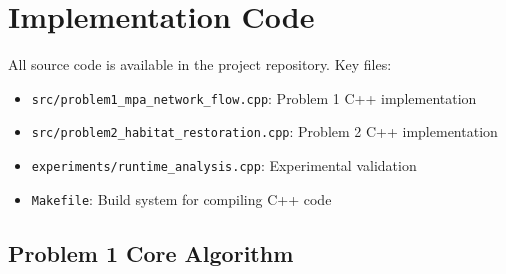 \documentclass[sigconf,nonacm]{acmart}
\begin{document}
\appendix

\section{Implementation Code}

All source code is available in the project repository. Key files:

\begin{itemize}
    \item \texttt{src/problem1\_mpa\_network\_flow.cpp}: Problem 1 C++ implementation
    \item \texttt{src/problem2\_habitat\_restoration.cpp}: Problem 2 C++ implementation
    \item \texttt{experiments/runtime\_analysis.cpp}: Experimental validation
    \item \texttt{Makefile}: Build system for compiling C++ code
\end{itemize}

\subsection{Problem 1 Core Algorithm}
\end{document}
